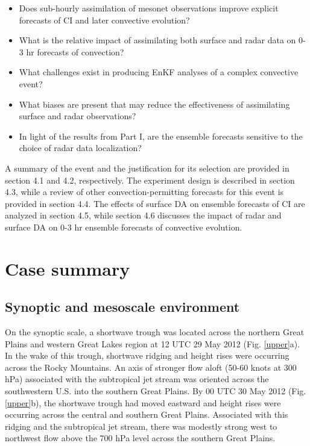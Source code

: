 \begin{itemize}
\item Does sub-hourly assimilation of mesonet observations improve explicit forecasts of CI and later convective evolution?
\item What is the relative impact of assimilating both surface and radar data on 0-3 hr forecasts of convection?
\item What challenges exist in producing EnKF analyses of a complex convective event?
\item What biases are present that may reduce the effectiveness of assimilating surface and radar observations?
\item In light of the results from Part I, are the ensemble forecasts sensitive to the choice of radar data localization?
\end{itemize}

A summary of the event and the justification for its selection are provided in section 4.1 and 4.2, respectively. The experiment design is described in section 4.3, while a review of other convection-permitting forecasts for this event is provided in section 4.4. The effects of surface DA on ensemble forecasts of CI are analyzed in section 4.5, while section 4.6 discusses the impact of radar and surface DA on 0-3 hr ensemble forecasts of convective evolution.

\section{Case summary}
\subsection{Synoptic and mesoscale environment}
On the synoptic scale, a shortwave trough was located across the northern Great Plains and western Great Lakes region at 12 UTC 29 May 2012 (Fig. \ref{upper}a). In the wake of this trough, shortwave ridging and height rises were occurring across the Rocky Mountains. An axis of stronger flow aloft (50-60 knots at 300 hPa) associated with the subtropical jet stream was oriented across the southwestern U.S. into the southern Great Plains. By 00 UTC 30 May 2012 (Fig. \ref{upper}b), the shortwave trough had moved eastward and height rises were occurring across the central and southern Great Plains. Associated with this ridging and the subtropical jet stream, there was modestly strong west to northwest flow above the 700 hPa level across the southern Great Plains.

